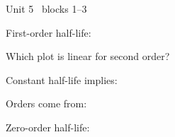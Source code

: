 \documentclass{apchem-worksheet}
\begin{document}
\begin{spiralstrip}{Unit 5 \textbullet\ blocks 1--3}
  \item First-order half-life: 
  \item Which plot is linear for second order?
  \item Constant half-life implies: 
  \item Orders come from: 
  \item Zero-order half-life: 
\end{spiralstrip}
\end{document}
